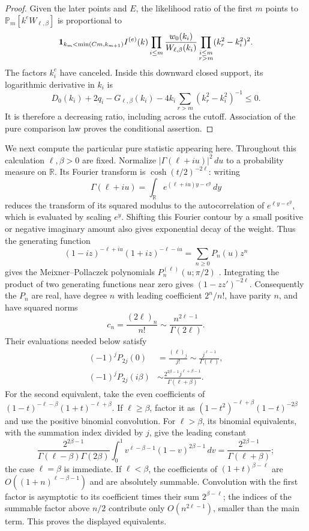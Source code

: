 \begin{proof}
Given the later points and $E$, the likelihood ratio of the first $m$
points to $\mathbb P_m[k^eW_{\ell,\beta}]$ is proportional to
\[
 {\bf1}_{k_m<\min(Cm,k_{m+1})}
 I^{(e)}(k)\prod_{i\le m}\frac{w_0(k_i)}{W_{\ell,\beta}(k_i)}
 \prod_{\substack{i\le m\\r>m}}(k_r^2-k_i^2)^2.
\]
The factors $k_i^e$ have canceled. Inside this downward closed support,
its logarithmic derivative in $k_i$ is
\[
 D_0(k_i)+2q_i-G_{\ell,\beta}(k_i)
 -4k_i\sum_{r>m}(k_r^2-k_i^2)^{-1}\le0.
\]
It is therefore a decreasing ratio, including across the cutoff.
Association of the pure comparison law proves the conditional assertion.
\end{proof}

We next compute the particular pure statistic appearing here. Throughout
this calculation $\ell,\beta>0$ are fixed. Normalize
$|\Gamma(\ell+iu)|^2\,du$ to a probability measure on $\mathbb R$.
Its Fourier transform is $\cosh(t/2)^{-2\ell}$: writing
\[
 \Gamma(\ell+iu)=\int_{\mathbb R}e^{(\ell+iu)y-e^y}\,dy
\]
reduces the transform of its squared modulus to the autocorrelation of
$e^{\ell y-e^y}$, which is evaluated by scaling $e^y$. Shifting this
Fourier contour by a small positive or negative imaginary amount also
gives exponential decay of the weight. Thus the generating function
\[
 (1-iz)^{-\ell+iu}(1+iz)^{-\ell-iu}
 =\sum_{n\ge0}P_n(u)z^n
\]
gives the Meixner--Pollaczek polynomials
$P_n^{(\ell)}(u;\pi/2)$ \cite[Equation~18.23.7]{DLMF}. Integrating the
product of two generating functions near zero gives
$(1-zz')^{-2\ell}$. Consequently the $P_n$ are real, have degree $n$
with leading coefficient $2^n/n!$, have parity $n$, and have squared norms
\[
 c_n=\frac{(2\ell)_n}{n!}\sim\frac{n^{2\ell-1}}{\Gamma(2\ell)}.
\]
Their evaluations needed below satisfy
\[
 \begin{aligned}
 (-1)^jP_{2j}(0)&=\frac{(\ell)_j}{j!}
 \sim\frac{j^{\ell-1}}{\Gamma(\ell)},\\
 (-1)^jP_{2j}(i\beta)&
 \sim\frac{2^{2\beta-1}j^{\ell+\beta-1}}{\Gamma(\ell+\beta)}.
 \end{aligned}
\]
For the second equivalent, take the even coefficients of
$(1-t)^{-\ell-\beta}(1+t)^{-\ell+\beta}$. If $\ell\ge\beta$, factor it
as $(1-t^2)^{-\ell+\beta}(1-t)^{-2\beta}$ and use the positive binomial
convolution. For $\ell>\beta$, its binomial equivalents, with the
summation index divided by $j$, give the leading constant
\[
 \frac{2^{2\beta-1}}{\Gamma(\ell-\beta)\Gamma(2\beta)}
 \int_0^1v^{\ell-\beta-1}(1-v)^{2\beta-1}\,dv
 =\frac{2^{2\beta-1}}{\Gamma(\ell+\beta)};
\]
the case $\ell=\beta$ is immediate. If $\ell<\beta$, the coefficients of
$(1+t)^{\beta-\ell}$ are $O((1+n)^{\ell-\beta-1})$ and are absolutely
summable. Convolution with the first factor is asymptotic to its
coefficient times their sum $2^{\beta-\ell}$; the indices of the
summable factor above $n/2$ contribute only $O(n^{2\ell-1})$, smaller
than the main term. This proves the displayed equivalents.

